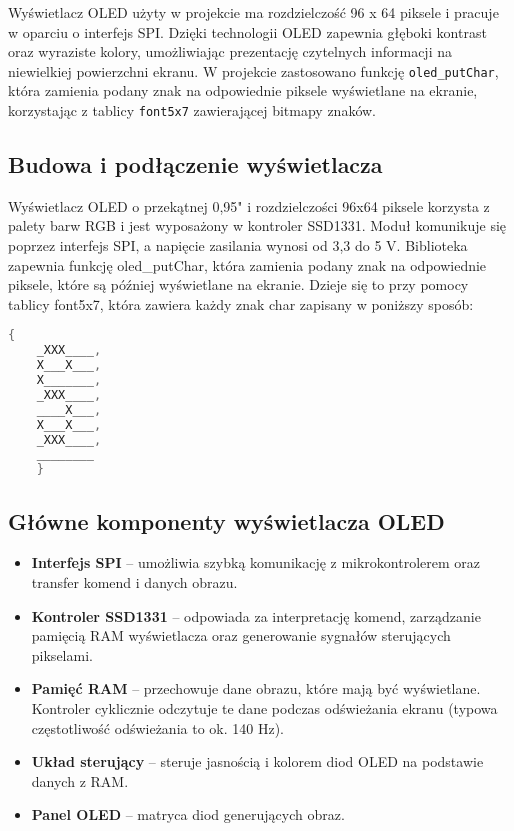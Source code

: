 \documentclass[letterpaper,11pt]{report}
\begin{document}
Wyświetlacz OLED użyty w projekcie ma rozdzielczość 96 x 64 piksele i pracuje w oparciu o interfejs SPI. Dzięki technologii OLED zapewnia głęboki kontrast oraz wyraziste kolory, umożliwiając prezentację czytelnych informacji na niewielkiej powierzchni ekranu. W projekcie zastosowano funkcję \texttt{oled\_putChar}, która zamienia podany znak na odpowiednie piksele wyświetlane na ekranie, korzystając z tablicy \texttt{font5x7} zawierającej bitmapy znaków.

\subsection{Budowa i podłączenie wyświetlacza}

Wyświetlacz OLED o przekątnej 0,95" i rozdzielczości 96x64 piksele korzysta z palety barw RGB i jest wyposażony w kontroler SSD1331. Moduł komunikuje się poprzez interfejs SPI, a napięcie zasilania wynosi od 3,3 do 5 V. Biblioteka zapewnia funkcję oled\_putChar, która zamienia podany znak na odpowiednie piksele, które są później wyświetlane na ekranie. Dzieje się to przy pomocy tablicy font5x7, która zawiera każdy znak char zapisany w poniższy sposób:
\begin{lstlisting}[language=C]
    {
    _XXX____,
    X___X___,
    X_______,
    _XXX____,
    ____X___,
    X___X___,
    _XXX____,
    ________
    }
\end{lstlisting}

\subsection{Główne komponenty wyświetlacza OLED}

\begin{itemize}
    \item \textbf{Interfejs SPI} – umożliwia szybką komunikację z mikrokontrolerem oraz transfer komend i danych obrazu.
    \item \textbf{Kontroler SSD1331} – odpowiada za interpretację komend, zarządzanie pamięcią RAM wyświetlacza oraz generowanie sygnałów sterujących pikselami.
    \item \textbf{Pamięć RAM} – przechowuje dane obrazu, które mają być wyświetlane. Kontroler cyklicznie odczytuje te dane podczas odświeżania ekranu (typowa częstotliwość odświeżania to ok. 140 Hz).
    \item \textbf{Układ sterujący} – steruje jasnością i kolorem diod OLED na podstawie danych z RAM.
    \item \textbf{Panel OLED} – matryca diod generujących obraz.
\end{itemize}
\end{document}
